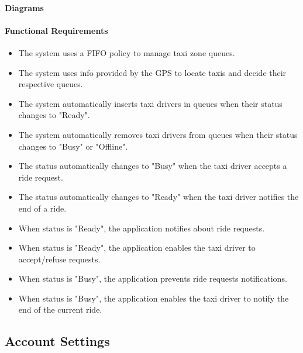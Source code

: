 \paragraph{Diagrams}

\paragraph{Functional Requirements}
\begin{itemize}
	
	\item The system uses a FIFO policy to manage taxi zone queues.
	
	\item The system uses info provided by the GPS to locate taxis and decide their respective queues.
	
	\item The system automatically inserts taxi drivers in queues when their status changes to "Ready".
	
	\item The system automatically removes taxi drivers from queues when their status changes to "Busy" or "Offline".
	
	\item The status automatically changes to "Busy" when the taxi driver accepts a ride request.
	
	\item The status automatically changes to "Ready" when the taxi driver notifies the end of a ride.
	
	\item When status is "Ready", the application notifies about ride requests.
	
	\item When status is "Ready", the application enables the taxi driver to accept/refuse requests.
	
	\item When status is "Busy", the application prevents ride requests notifications.
	
	\item When status is "Busy", the application enables the taxi driver to notify the end of the current ride.
	
\end{itemize}

\subsection{Account Settings}

